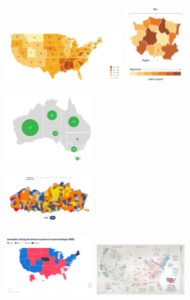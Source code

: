 \documentclass{article}
\begin{document}
\begin{figure}[H]
    \centering
    \includegraphics[width=0.4\textwidth]{dv-map1.png}
    \includegraphics[width=0.2\textwidth]{dv-map2.png}
    \caption{}
\end{figure}
\begin{figure}[H]
    \centering
    \includegraphics[width=0.3\textwidth]{dv-map3.png}
    \caption{}
\end{figure}
\begin{figure}[H]
    \centering
    \includegraphics[width=0.3\textwidth]{dv-map4.png}
    \caption{}
\end{figure}
\begin{figure}[H]
    \centering
    \includegraphics[width=0.3\textwidth]{dv-map5.png}
    \includegraphics[width=0.3\textwidth]{dv-map6.png}
    \caption{}
\end{figure}
\end{document}
